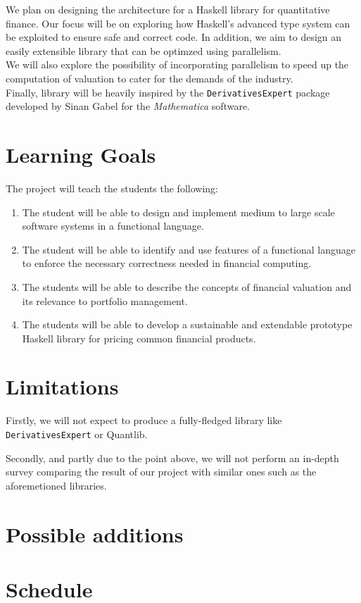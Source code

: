 \documentclass[11pt]{article}
\begin{document}
We plan on designing the architecture for a Haskell library for quantitative finance.
Our focus will be on exploring how Haskell's advanced type system can be exploited
to ensure safe and correct code. In addition, we aim to design an easily extensible
library that can be optimzed using parallelism.\\
We will also explore the possibility of incorporating parallelism to speed up the
computation of valuation to cater for the demands of the industry.\\

Finally, library will be heavily inspired by the {\tt DerivativesExpert} package developed by Sinan Gabel for the \emph{Mathematica} software\cite{Mathematica:DerivativesExpert}.

\section*{Learning Goals}

The project will teach the students the following:

\begin{enumerate}
\item The student will be able to design and implement medium to large scale software systems in a functional language. %
\item The student will be able to identify and use features of a functional language to enforce the necessary correctness needed in financial computing. %
\item The students will be able to describe the concepts of financial valuation and its relevance to portfolio management. %
\item The students will be able to develop a sustainable and extendable prototype Haskell library for pricing common financial products. %
\end{enumerate}

\section*{Limitations}

Firstly, we will not expect to produce a fully-fledged library like {\tt DerivativesExpert} or Quantlib\cite{Ame2003}.

Secondly, and partly due to the point above, we will not perform an in-depth survey
comparing the result of our project with similar ones such as the aforemetioned libraries.



\section*{Possible additions}

\section*{Schedule}



\end{document}
